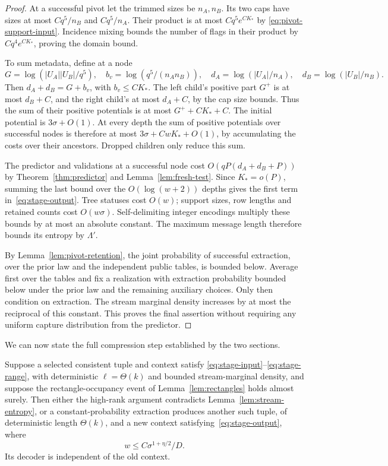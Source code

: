 \begin{proof}
At a successful pivot let the trimmed sizes be $n_A,n_B$.  Its two caps
have sizes at most $Cq^5/n_B$ and $Cq^5/n_A$.
Their product is at most $Cq^5e^{CK_*}$ by
\eqref{eq:pivot-support-input}.  Incidence mixing bounds the number of
flags in their product by $Cq^4e^{CK_*}$, proving the domain bound.

To sum metadata, define at a node
\[
 G=\log(|U_A||U_B|/q^5),\quad
 b_v=\log(q^5/(n_An_B)),\quad
 d_A=\log(|U_A|/n_A),\quad d_B=\log(|U_B|/n_B).
\]
Then $d_A+d_B=G+b_v$, with $b_v\le CK_*$.
The left child's positive part $G^+$ is at most $d_B+C$, and the
right child's at most $d_A+C$, by the cap size bounds.  Thus the sum
of their positive potentials is at most $G^++CK_*+C$.
The initial potential is $3\sigma+O(1)$.
At every depth the sum of positive potentials over successful nodes is
therefore at most $3\sigma+CwK_*+O(1)$, by accumulating the costs over
their ancestors.  Dropped children only reduce this sum.

The predictor and validations at a successful node cost
$O(qP(d_A+d_B+P))$ by Theorem~\ref{thm:predictor} and
Lemma~\ref{lem:fresh-test}.  Since $K_*=o(P)$, summing the last bound
over the $O(\log(w+2))$ depths gives the first term
in~\eqref{eq:stage-output}.  Tree statuses cost $O(w)$; support sizes,
row lengths and retained counts cost $O(w\sigma)$.  Self-delimiting
integer encodings multiply these bounds by at most an absolute constant.
The maximum message length therefore bounds its entropy by $\Lambda'$.

By Lemma~\ref{lem:pivot-retention}, the joint probability of successful
extraction, over the prior law and the independent public tables, is
bounded below.  Average first over the tables and fix a realization
with extraction probability bounded below under the prior law and the
remaining auxiliary choices.  Only then condition on extraction.
The stream marginal density increases by at most the reciprocal of
this constant.  This proves the final assertion without requiring any
uniform capture distribution from the predictor.
\end{proof}

We can now state the full compression step established by the two
sections.

\begin{proposition}\label{prop:compression-stage}
Suppose a selected consistent tuple and context satisfy
\eqref{eq:stage-input}--\eqref{eq:stage-range}, with deterministic
$\ell=\Theta(k)$ and bounded stream-marginal density, and suppose the
rectangle-occupancy event of Lemma~\ref{lem:rectangles} holds almost surely.
Then either the high-rank argument contradicts
Lemma~\ref{lem:stream-entropy}, or a constant-probability extraction
produces another such tuple, of deterministic length $\Theta(k)$, and
a new context satisfying~\eqref{eq:stage-output}, where
\begin{equation}\label{eq:window-count}
 w\le C\sigma^{1+\eta/2}/D.
\end{equation}
Its decoder is independent of the old context.
\end{proposition}

